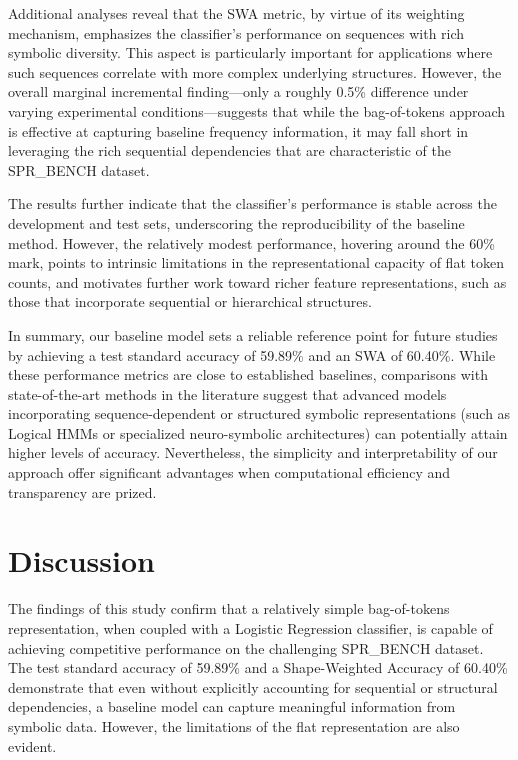 \documentclass{article}
\begin{document}
Additional analyses reveal that the SWA metric, by virtue of its weighting mechanism, emphasizes the classifier’s performance on sequences with rich symbolic diversity. This aspect is particularly important for applications where such sequences correlate with more complex underlying structures. However, the overall marginal incremental finding—only a roughly 0.5\% difference under varying experimental conditions—suggests that while the bag-of-tokens approach is effective at capturing baseline frequency information, it may fall short in leveraging the rich sequential dependencies that are characteristic of the SPR\_BENCH dataset.

The results further indicate that the classifier's performance is stable across the development and test sets, underscoring the reproducibility of the baseline method. However, the relatively modest performance, hovering around the 60\% mark, points to intrinsic limitations in the representational capacity of flat token counts, and motivates further work toward richer feature representations, such as those that incorporate sequential or hierarchical structures.

In summary, our baseline model sets a reliable reference point for future studies by achieving a test standard accuracy of 59.89\% and an SWA of 60.40\%. While these performance metrics are close to established baselines, comparisons with state-of-the-art methods in the literature suggest that advanced models incorporating sequence-dependent or structured symbolic representations (such as Logical HMMs or specialized neuro-symbolic architectures) can potentially attain higher levels of accuracy. Nevertheless, the simplicity and interpretability of our approach offer significant advantages when computational efficiency and transparency are prized.

\section{Discussion}
The findings of this study confirm that a relatively simple bag-of-tokens representation, when coupled with a Logistic Regression classifier, is capable of achieving competitive performance on the challenging SPR\_BENCH dataset. The test standard accuracy of 59.89\% and a Shape-Weighted Accuracy of 60.40\% demonstrate that even without explicitly accounting for sequential or structural dependencies, a baseline model can capture meaningful information from symbolic data. However, the limitations of the flat representation are also evident.
\end{document}
